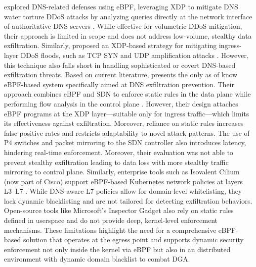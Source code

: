\documentclass [11pt, proquest] {uwthesis}[2020/02/24]
\begin{document}
\citeauthor{9165454} explored DNS-related defenses using eBPF, leveraging XDP to mitigate DNS water torture DDoS attacks by analyzing queries directly at the network interface of authoritative DNS servers \cite{9165454}. While effective for volumetric DDoS mitigation, their approach is limited in scope and does not address low-volume, stealthy data exfiltration. Similarly, \citeauthor{bertin2017xdp} proposed an XDP-based strategy for mitigating ingress-layer DDoS floods, such as TCP SYN and UDP amplification attacks \cite{bertin2017xdp}. However, this technique also falls short in handling sophisticated or covert DNS-based exfiltration threats.
Based on current literature, \citeauthor{steadman2021dnsxp} presents the only as of know eBPF-based system specifically aimed at DNS exfiltration prevention. Their approach combines eBPF and SDN to enforce static rules in the data plane while performing flow analysis in the control plane \cite{steadman2021dnsxp, 8725640}. However, their design attaches eBPF programs at the XDP layer—suitable only for ingress traffic—which limits its effectiveness against exfiltration. Moreover, reliance on static rules increases false-positive rates and restricts adaptability to novel attack patterns. The use of P4 switches and packet mirroring to the SDN controller also introduces latency, hindering real-time enforcement. Moreover, their evaluation was not able to prevent stealthy exfiltration leading to data loss with more stealthy traffic mirroring to control plane. Similarly, enterprise tools such as Isovalent Cilium (now part of Cisco) support eBPF-based Kubernetes network policies at layers L3–L7 \cite{zavarella2022methodology}. While DNS-aware L7 policies allow for domain-level whitelisting, they lack dynamic blacklisting and are not tailored for detecting exfiltration behaviors. Open-source tools like Microsoft’s Inspector Gadget also rely on static rules defined in userspace and do not provide deep, kernel-level enforcement mechanisms. These limitations highlight the need for a comprehensive eBPF-based solution that operates at the egress point and supports dynamic security enforcement not only inside the kernel via eBPF but also in an distributed environment with dynamic domain blacklist to combat DGA. 
\end{document}
